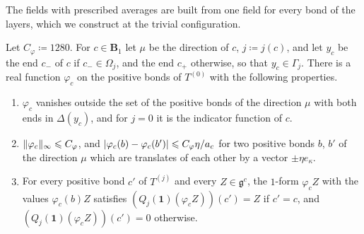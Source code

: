 \documentclass[11pt]{preprint}
\newcommand{\id}{\mathbf 1}
\DeclarePairedDelimiter{\abs}{\lvert}{\rvert}
\DeclarePairedDelimiter{\norm}{\lVert}{\rVert}
\numberwithin{equation}{section}
\begin{document}
The fields with prescribed averages are built from one field for every bond of the layers, which we construct at the trivial configuration.

\begin{lemma}\label{lem:bumps}
Let $C_\varphi \coloneqq 1280$. For $c \in \mathbf B_1$ let $\mu$ be the direction of $c$, $j \coloneqq j(c)$, and let $y_c$ be the end $c_-$ of $c$ if $c_- \in \Omega_j$, and the end $c_+$ otherwise, so that $y_c \in \Gamma_j$. There is a real function $\varphi_c$ on the positive bonds of $T^{(0)}$ with the following properties.
\begin{enumerate}[label=(\roman*)]
\item $\varphi_c$ vanishes outside the set of the positive bonds of the direction $\mu$ with both ends in $\Delta(y_c)$, and for $j = 0$ it is the indicator function of $c$.
\item $\norm{\varphi_c}_\infty \leqslant C_\varphi$, and $\abs{\varphi_c(b) - \varphi_c(b')} \leqslant C_\varphi\eta/a_c$ for two positive bonds $b$, $b'$ of the direction $\mu$ which are translates of each other by a vector $\pm\eta e_\kappa$.
\item For every positive bond $c'$ of $T^{(j)}$ and every $Z \in \mathfrak g^c$, the $1$-form $\varphi_cZ$ with the values $\varphi_c(b)Z$ satisfies $(Q_j(\id)(\varphi_cZ))(c') = Z$ if $c' = c$, and $(Q_j(\id)(\varphi_cZ))(c') = 0$ otherwise.
\end{enumerate}
\end{lemma}
\end{document}

